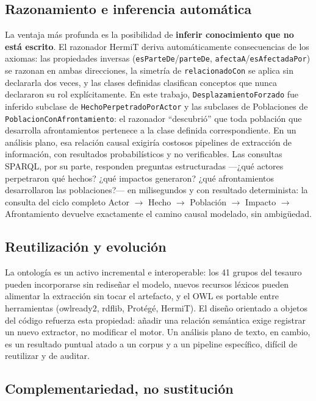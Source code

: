 \documentclass[11pt]{tg_usta}
\begin{document}
\subsection{Razonamiento e inferencia automática}

La ventaja más profunda es la posibilidad de \textbf{inferir conocimiento que no está escrito}. El razonador HermiT deriva automáticamente consecuencias de los axiomas: las propiedades inversas (\texttt{esParteDe}/\texttt{parteDe}, \texttt{afectaA}/\texttt{esAfectadaPor}) se razonan en ambas direcciones, la simetría de \texttt{relacionadoCon} se aplica sin declararla dos veces, y las clases definidas clasifican conceptos que nunca declararon su rol explícitamente. En este trabajo, \texttt{DesplazamientoForzado} fue inferido subclase de \texttt{HechoPerpetradoPorActor} y las subclases de Poblaciones de \texttt{PoblacionConAfrontamiento}: el razonador ``descubrió'' que toda población que desarrolla afrontamientos pertenece a la clase definida correspondiente. En un análisis plano, esa relación causal exigiría costosos pipelines de extracción de información, con resultados probabilísticos y no verificables. Las consultas SPARQL, por su parte, responden preguntas estructuradas ---¿qué actores perpetraron qué hechos? ¿qué impactos generaron? ¿qué afrontamientos desarrollaron las poblaciones?--- en milisegundos y con resultado determinista: la consulta del ciclo completo Actor $\rightarrow$ Hecho $\rightarrow$ Población $\rightarrow$ Impacto $\rightarrow$ Afrontamiento devuelve exactamente el camino causal modelado, sin ambigüedad.

\subsection{Reutilización y evolución}

La ontología es un activo incremental e interoperable: los 41 grupos del tesauro pueden incorporarse sin rediseñar el modelo, nuevos recursos léxicos pueden alimentar la extracción sin tocar el artefacto, y el OWL es portable entre herramientas (owlready2, rdflib, Protégé, HermiT). El diseño orientado a objetos del código refuerza esta propiedad: añadir una relación semántica exige registrar un nuevo extractor, no modificar el motor. Un análisis plano de texto, en cambio, es un resultado puntual atado a un corpus y a un pipeline específico, difícil de reutilizar y de auditar.

\subsection{Complementariedad, no sustitución}
\end{document}
